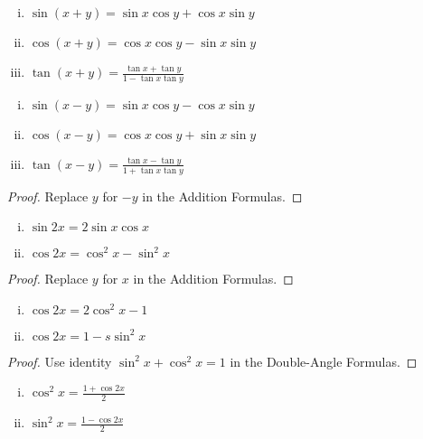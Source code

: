 \documentclass[a4paper,11pt]{article}
\begin{document}
\begin{outline}
    \begin{enumerate}[i.]
      \item \(\sin{(x+y)} = \sin{x}\cos{y} + \cos{x}\sin{y}\)
      \item \(\cos{(x+y)} = \cos{x}\cos{y} - \sin{x}\sin{y}\)
      \item \(\tan{(x+y)} = \frac{\tan{x}+\tan{y}}{1-\tan{x}\tan{y}}\)
    \end{enumerate}
   
  \pagebreak 
    \begin{enumerate}[i.]
      \item \(\sin{(x-y)} = \sin{x}\cos{y} - \cos{x}\sin{y}\)
      \item \(\cos{(x-y)} = \cos{x}\cos{y} + \sin{x}\sin{y}\)
      \item \(\tan{(x-y)} = \frac{\tan{x}-\tan{y}}{1+\tan{x}\tan{y}}\)
    \end{enumerate}
    
    \begin{proof}
      Replace \(y\) for \(-y\) in the Addition Formulas.
    \end{proof}
    
    \begin{enumerate}[i.]
      \item \(\sin{2x} = 2\sin{x}\cos{x}\)
      \item \(\cos{2x} = \cos^2 x - \sin^2 x\)
    \end{enumerate}
    
    \begin{proof}
      Replace \(y\) for \(x\) in the Addition Formulas.
    \end{proof}
    
    \begin{enumerate}[i.]
      \item \(\cos{2x} = 2\cos^2 x - 1\)
      \item \(\cos{2x} = 1 - s\sin^2 x\)
    \end{enumerate}
    
    \begin{proof}
      Use identity \(\sin^2 x + \cos^2 x = 1\) in the Double-Angle Formulas.
    \end{proof}
    
    \begin{enumerate}[i.]
      \item \(\cos^2 x = \frac{1 + \cos{2x}}{2}\)
      \item \(\sin^2 x = \frac{1 - \cos{2x}}{2}\)
    \end{enumerate}
    

\end{outline}
\end{document}
